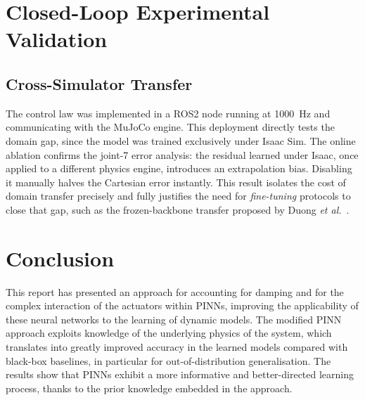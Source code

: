 \documentclass[a4paper, oneside]{article}
\begin{document}
\section{Closed-Loop Experimental Validation}
\label{sec-validation}

\subsection{Cross-Simulator Transfer}
\label{sec-res-ablation}

The control law was implemented in a ROS2 node running at \SI{1000}{\hertz} and communicating with the MuJoCo engine. This deployment directly tests the domain gap, since the model was trained exclusively under Isaac Sim. %
The online ablation confirms the joint-7 error analysis: the residual learned under Isaac, once applied to a different physics engine, introduces an extrapolation bias. Disabling it manually halves the Cartesian error instantly. This result isolates the cost of domain transfer precisely and fully justifies the need for \emph{fine-tuning} protocols to close that gap, such as the frozen-backbone transfer proposed by Duong \emph{et al.}~\cite{duong2024}.

\section{Conclusion}
\label{sec-conclusion}

This report has presented an approach for accounting for damping and for the complex interaction of the actuators within PINNs, improving the applicability of these neural networks to the learning of dynamic models. The modified PINN approach exploits knowledge of the underlying physics of the system, which translates into greatly improved accuracy in the learned models compared with black-box baselines, in particular for out-of-distribution generalisation. The results show that PINNs exhibit a more informative and better-directed learning process, thanks to the prior knowledge embedded in the approach.
\end{document}
